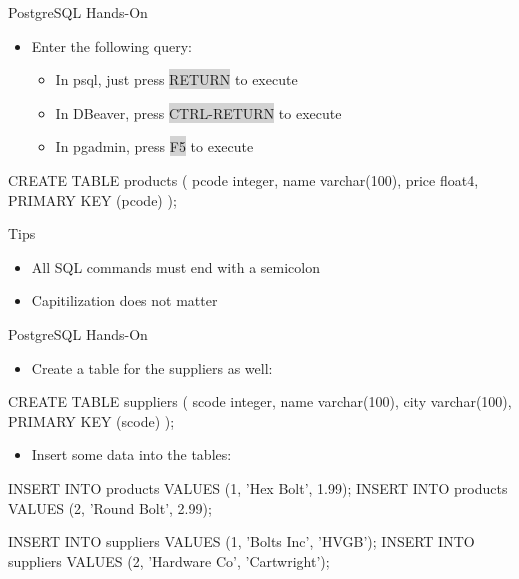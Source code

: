 \documentclass[ignorenonframetext,xcolor=x11names]{beamer}
\begin{document}
\begin{frame}[fragile]{PostgreSQL Hands-On}
\begin{itemize}
\item Enter the following query:
\begin{itemize}
    \item In psql, just press \colorbox{lightgray}{RETURN} to execute
    \item In DBeaver, press \colorbox{lightgray}{CTRL-RETURN} to execute
    \item In pgadmin, press \colorbox{lightgray}{F5} to execute
\end{itemize}
\end{itemize}
\footnotesize
\begin{sqlcode}
CREATE TABLE products (
  pcode integer,
  name  varchar(100),
  price float4,
  PRIMARY KEY (pcode) );
\end{sqlcode}
\normalsize
\vspace{-5mm}
\begin{block}{Tips}
\begin{itemize}
  \item All SQL commands must end with a semicolon
  \item Capitilization does not matter
\end{itemize}
\end{block}
\end{frame}

\begin{frame}[fragile]{PostgreSQL Hands-On}
\begin{itemize}
  \item Create a table for the suppliers as well:
\end{itemize}
\footnotesize
\begin{sqlcode}
CREATE TABLE suppliers (
  scode integer,
  name  varchar(100),
  city  varchar(100),
  PRIMARY KEY (scode) );
\end{sqlcode}
\normalsize
\begin{itemize}
  \item Insert some data into the tables:
\end{itemize}
\footnotesize
\begin{sqlcode}
INSERT INTO products VALUES (1, 'Hex Bolt', 1.99);
INSERT INTO products VALUES (2, 'Round Bolt', 2.99);

INSERT INTO suppliers VALUES (1, 'Bolts Inc', 'HVGB');
INSERT INTO suppliers 
    VALUES (2, 'Hardware Co', 'Cartwright');
\end{sqlcode}
\vspace{5mm}
\end{frame}
\end{document}
